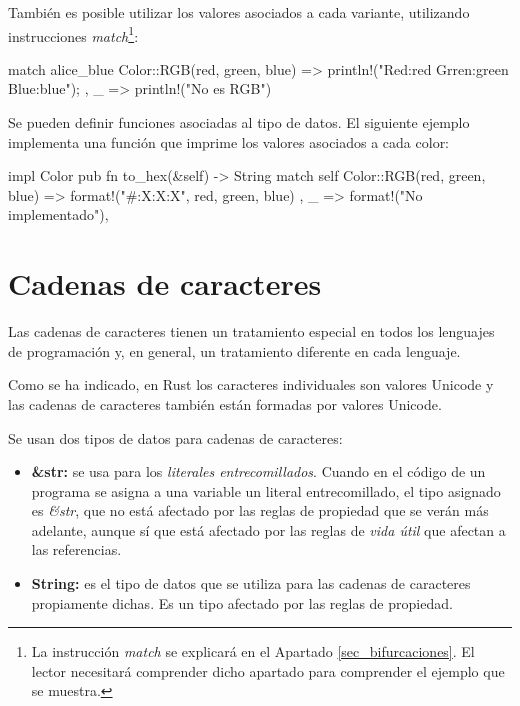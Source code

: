 También es posible utilizar los valores asociados a cada variante, utilizando instrucciones \textit{match}\footnote{La instrucción \textit{match} se explicará en el Apartado \ref{sec_bifurcaciones}. El lector necesitará comprender dicho apartado para comprender el ejemplo que se muestra.}:

\vspace{0.7em}
\begin{Codigo}
match alice_blue {
   Color::RGB(red, green, blue) => {
      println!("Red:{red} Grren:{green} Blue:{blue}");
   },
   _ => println!("No es RGB")
}
\end{Codigo}

Se pueden definir funciones asociadas al tipo de datos. El siguiente ejemplo implementa una función que imprime los valores asociados a cada color:

\vspace{0.7em}
\begin{Codigo}
impl Color {
   pub fn to_hex(&self) -> String {
      match self {
         Color::RGB(red, green, blue) => {
            format!("#{:X}{:X}{:X}", red, green, blue)
         },
         _ => format!("No implementado"),
      }
   }
}
\end{Codigo}

\section{Cadenas de caracteres}
Las cadenas de caracteres tienen un tratamiento especial en todos los lenguajes de programación y, en general, un tratamiento diferente en cada lenguaje. 

Como se ha indicado, en Rust los caracteres individuales son valores Unicode y las cadenas de caracteres también están formadas por valores Unicode.

Se usan dos tipos de datos para cadenas de caracteres:

\begin{itemize}
   \item \textbf{\&str:} se usa para los \textit{literales entrecomillados}. Cuando en el código de un programa se asigna a una variable un literal entrecomillado, el tipo asignado es \textit{\&str}, que no está afectado por las reglas de propiedad que se verán más adelante, aunque sí que está afectado por las reglas de \textit{vida útil} que afectan a las referencias. 
   \item \textbf{String:} es el tipo de datos que se utiliza para las cadenas de caracteres propiamente dichas. Es un tipo afectado por las reglas de propiedad.
\end{itemize}

